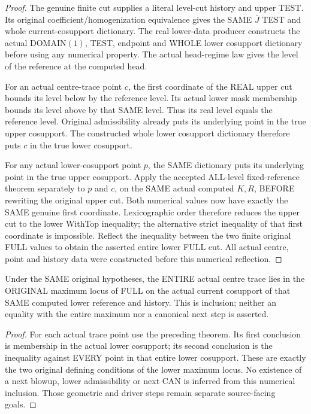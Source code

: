 \begin{proof}
The genuine finite cut supplies a literal level-cut history and upper
TEST. Its original coefficient/homogenization equivalence gives the SAME
$\bar J$ TEST and whole current-cosupport dictionary. The real lower-data
producer constructs the actual DOMAIN$(1)$, TEST, endpoint and WHOLE lower
cosupport dictionary before using any numerical property. The actual
head-regime law gives the level of the reference at the computed head.

For an actual centre-trace point $c$, the first coordinate of the REAL
upper cut bounds its level below by the reference level. Its actual lower
mask membership bounds its level above by that SAME level. Thus its real
level equals the reference level. Original admissibility already puts its
underlying point in the true upper cosupport. The constructed whole lower
cosupport dictionary therefore puts $c$ in the true lower cosupport.

For any actual lower-cosupport point $p$, the SAME dictionary puts its
underlying point in the true upper cosupport. Apply the accepted ALL-level
fixed-reference theorem separately to $p$ and $c$, on the SAME actual
computed $K,R$, BEFORE rewriting the original upper cut. Both numerical
values now have exactly the SAME genuine first coordinate. Lexicographic
order therefore reduces the upper cut to the lower WithTop inequality;
the alternative strict inequality of that first coordinate is impossible.
Reflect the inequality between the two finite original FULL values to
obtain the asserted entire lower FULL cut. All actual centre, point and
history data were constructed before this numerical reflection.
\end{proof}

\begin{corollary}
\label{hir:original-finite-cut-lower-maximum-inclusion}
\leanok
Under the SAME original hypotheses, the ENTIRE actual centre trace lies
in the ORIGINAL maximum locus of FULL on the actual current cosupport of
that SAME computed lower reference and history. This is inclusion; neither
an equality with the entire maximum nor a canonical next step is asserted.
\end{corollary}
\begin{proof}
For each actual trace point use the preceding theorem. Its first conclusion
is membership in the actual lower cosupport; its second conclusion is the
inequality against EVERY point in that entire lower cosupport. These are
exactly the two original defining conditions of the lower maximum locus.
No existence of a next blowup, lower admissibility or next CAN is inferred
from this numerical inclusion. Those geometric and driver steps remain
separate source-facing goals.
\end{proof}
